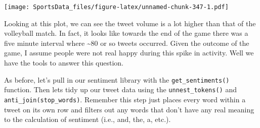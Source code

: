 \documentclass[
]{book}
\newenvironment{Shaded}{\begin{snugshade}}{\end{snugshade}}
\newcommand{\DataTypeTok}[1]{\textcolor[rgb]{0.13,0.29,0.53}{#1}}
\newcommand{\KeywordTok}[1]{\textcolor[rgb]{0.13,0.29,0.53}{\textbf{#1}}}
\newcommand{\NormalTok}[1]{#1}
\newcommand{\OperatorTok}[1]{\textcolor[rgb]{0.81,0.36,0.00}{\textbf{#1}}}
\newcommand{\StringTok}[1]{\textcolor[rgb]{0.31,0.60,0.02}{#1}}
\begin{document}
\begin{Shaded}
\end{Shaded}

\texttt{[image: SportsData\_files/figure-latex/unnamed-chunk-347-1.pdf]}

Looking at this plot, we can see the tweet volume is a lot higher than that of the volleyball match. In fact, it looks like towards the end of the game there was a five minute interval where \textasciitilde80 or so tweets occurred. Given the outcome of the game, I assume people were not real happy during this spike in activity. Well we have the tools to answer this question.

As before, let's pull in our sentiment library with the \texttt{get\_sentiments()} function. Then lets tidy up our tweet data using the \texttt{unnest\_tokens()} and \texttt{anti\_join(stop\_words)}. Remember this step just places every word within a tweet on its own row and filters out any words that don't have any real meaning to the calculation of sentiment (i.e., and, the, a, etc.).

\begin{Shaded}
\end{Shaded}
\end{document}
